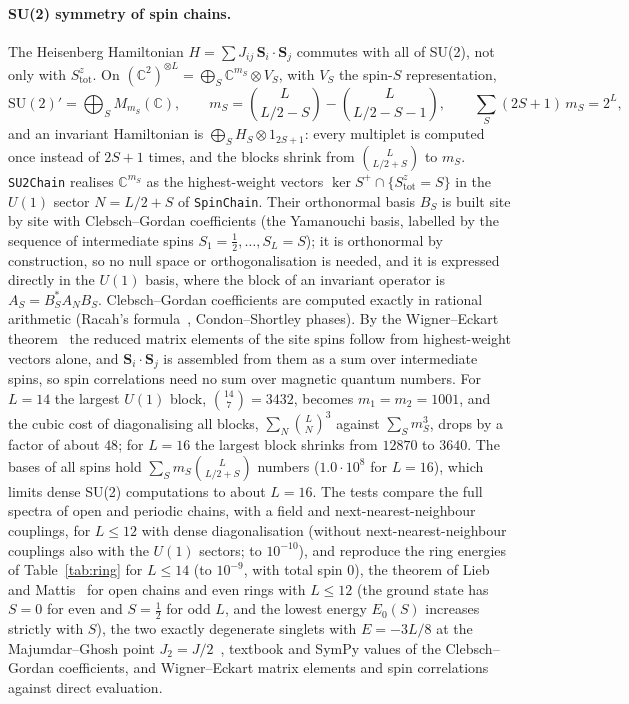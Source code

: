 \documentclass[11pt]{article}
\newcommand{\C}{\mathbb{C}}
\begin{document}
\paragraph{SU(2) symmetry of spin chains.} The Heisenberg Hamiltonian $H=\sum J_{ij}\,\mathbf S_i\cdot\mathbf S_j$
commutes with all of SU(2), not only with $S^z_{\mathrm{tot}}$. On $(\C^2)^{\otimes L}=\bigoplus_S\C^{m_S}\otimes
V_S$, with $V_S$ the spin-$S$ representation,
\[
  \mathrm{SU}(2)'=\bigoplus_SM_{m_S}(\C),\qquad m_S=\binom{L}{L/2-S}-\binom{L}{L/2-S-1},\qquad
  \sum_S(2S+1)\,m_S=2^L ,
\]
and an invariant Hamiltonian is $\bigoplus_SH_S\otimes1_{2S+1}$: every multiplet is computed once instead of $2S+1$
times, and the blocks shrink from $\binom L{L/2+S}$ to $m_S$. \texttt{SU2Chain} realises $\C^{m_S}$ as the
highest-weight vectors $\ker S^+\cap\{S^z_{\mathrm{tot}}=S\}$ in the $U(1)$ sector $N=L/2+S$ of \texttt{SpinChain}.
Their orthonormal basis $B_S$ is built site by site with Clebsch--Gordan coefficients (the Yamanouchi basis, labelled by
the sequence of intermediate spins $S_1=\frac12,\dots,S_L=S$); it is orthonormal by construction, so no null space or
orthogonalisation is needed, and it is expressed directly in the $U(1)$ basis, where the block of an invariant
operator is $A_S=B_S^*A_NB_S$. Clebsch--Gordan coefficients are computed exactly in rational arithmetic (Racah's
formula~\cite{racah1942}, Condon--Shortley phases). By the Wigner--Eckart theorem~\cite{edmonds1957} the reduced
matrix elements of the site spins follow from highest-weight vectors alone, and $\mathbf S_i\cdot\mathbf S_j$ is
assembled from them as a sum over intermediate spins, so spin correlations need no sum over magnetic quantum numbers.
For $L=14$ the largest $U(1)$ block, $\binom{14}{7}=3432$, becomes $m_1=m_2=1001$, and the cubic cost of diagonalising
all blocks, $\sum_N\binom LN^3$ against $\sum_Sm_S^3$, drops by a factor of about $48$; for $L=16$ the largest block
shrinks from $12870$ to $3640$. The bases of all spins hold $\sum_Sm_S\binom L{L/2+S}$ numbers ($1.0\cdot10^8$ for
$L=16$), which limits dense SU(2) computations to about $L=16$. The tests compare the full spectra of open and periodic
chains, with a field and next-nearest-neighbour couplings, for $L\le12$ with dense diagonalisation (without next-nearest-neighbour
couplings also with the $U(1)$ sectors; to $10^{-10}$), and reproduce the ring energies of Table~\ref{tab:ring} for $L\le14$ (to $10^{-9}$, with total
spin $0$), the theorem of Lieb and Mattis~\cite{lieb1962} for open chains and even rings with $L\le12$ (the ground
state has $S=0$ for even and $S=\frac12$ for odd $L$, and the lowest energy $E_0(S)$ increases strictly with $S$), the
two exactly degenerate singlets with $E=-3L/8$ at the Majumdar--Ghosh point $J_2=J/2$~\cite{majumdar1969,majumdar1969b}, textbook
and SymPy values of the Clebsch--Gordan coefficients, and Wigner--Eckart matrix elements and spin correlations against
direct evaluation.
\end{document}
